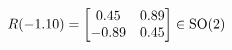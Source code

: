 \documentclass[preview]{standalone}
\begin{document}
\begin{align*}
\special{dvisvgm:raw <g id='unique000'>}R(-1.10) = \begin{bmatrix} 0.45 & 0.89 \\ -0.89 & 0.45 \end{bmatrix} \in \text{SO}(2)\special{dvisvgm:raw </g>}
\end{align*}
\end{document}
